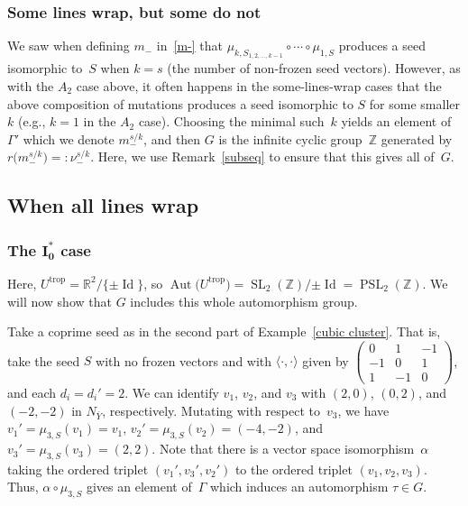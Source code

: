 \documentclass[10pt,a4paper]{amsart}
\numberwithin{equation}{section}
\numberwithin{figure}{section}
\numberwithin{table}{section}
\DeclareMathOperator{\id}{Id}
\DeclareMathOperator{\Id}{Id}
\DeclareMathOperator{\SL}{SL}
\DeclareMathOperator{\PSL}{PSL}
\DeclareMathOperator{\trop}{trop}
\DeclareMathOperator{\Aut}{Aut}
\let\?=\overline
\let\bb=\mathbb
\theoremstyle{definition}
\begin{document}
\subsubsection{Some lines wrap, but some do not} We saw when defining $m_-$ in~\eqref{m-} that $\mu_{k,S_{1,2,\dots,k-1}}\circ \cdots \circ \mu_{1,S}$ produces a seed isomorphic to~$S$ when $k=s$ (the number of non-frozen seed vectors). However, as with the $A_2$ case above, it often happens in the some-lines-wrap cases that the above composition of mutations produces a seed isomorphic to $S$ for some smaller $k$ (e.g., $k=1$ in the $A_2$ case). Choosing the minimal such~$k$ yields an element of $\Gamma'$ which we denote $m_-^{s/k}$, and then $G$ is the infinite cyclic group~$\bb{Z}$ generated by $r\big(m_-^{s/k}\big)=:\nu_-^{s/k}$. Here, we use Remark~\ref{subseq} to ensure that this gives all of~$G$.

\subsection{When all lines wrap}\label{Auto-wrap}

\subsubsection[The $I_0^*$ case]{The $\boldsymbol{I_0^*}$ case}\label{I0star} Here, $U^{\trop}=\bb{R}^2/\{\pm \Id\}$, so $\Aut\big(U^{\trop}\big)=\SL_2(\bb{Z})/{\pm \id} = \PSL_2(\bb{Z})$. We will now show that $G$ includes this whole automorphism group.

Take a coprime seed as in the second part of Example~\ref{cubic cluster}. That is, take the seed $S$ with no frozen vectors and with $\langle \cdot,\cdot\rangle$ given by
	$\left(\begin{smallmatrix}
		0 &1 &-1 \\
	 -1 &0 &1 \\
	 1 &-1 &0
		\end{smallmatrix}\right)$,
		and each $d_i=d_i'=2$. We can identify $v_1$, $v_2$, and $v_3$ with $(2,0)$, $(0,2)$, and $(-2,-2)$ in $N_{\?{Y}}$, respectively. Mutating with respect to~$v_3$, we have $v_1'=\mu_{3,S}(v_1)=v_1$, $v_2'=\mu_{3,S}(v_2)=(-4,-2)$, and $v_3'=\mu_{3,S}(v_3)=(2,2)$. Note that there is a vector space isomorphism~$\alpha$ taking the ordered triplet $(v_1',v_3',v_2')$ to the ordered triplet $(v_1,v_2,v_3)$. Thus, $\alpha \circ \mu_{3,S}$ gives an element of~$\Gamma$ which induces an automorphism $\tau \in G$.
		
\end{document}
